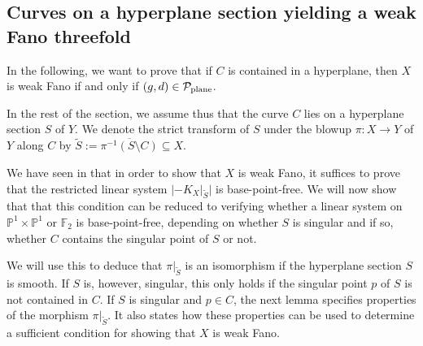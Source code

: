 \documentclass[english,11pt,reqno]{amsart}
\newcommand{\sub}{\subseteq}
\newcommand{\PxP}{\mathbb{P}^1 \times \mathbb{P}^1}
\newcommand{\Ftwo}{\mathbb{F}_2}
\begin{document}
\subsection{Curves on a hyperplane section yielding a weak Fano threefold} \label{subsection:hyperplane_weak_Fano}
%
In the following, we want to prove that if $C$ is contained in a hyperplane, then $X$ is weak Fano if and only if $(g,d)\in \mathcal{P}_{\textup{plane}}$. \par 
In the rest of the section, we assume thus that the curve $C$ lies on a hyperplane section $S$ of $Y$. We denote the strict transform of $S$ under the blowup $\pi:X\rightarrow Y$ of $Y$ along $C$ by $\widetilde{S}:=\overline{\pi^{-1}(S\setminus C)}\sub X$. \par 
We have seen in  that in order to show that $X$ is weak Fano, it suffices to prove that the restricted linear system $|-K_X|_{\widetilde{S}}|$ is base-point-free.
%
%
We will now show that that this condition can be reduced to verifying whether a linear system on $\PxP$ or $\Ftwo$ is base-point-free, depending on whether $S$ is singular and if so, whether $C$ contains the singular point of $S$ or not.
%

%
We will use this to deduce that $\pi|_{\widetilde{S}}$ is an isomorphism if the hyperplane section $S$ is smooth. If $S$ is, however, singular, this only holds if the singular point $p$ of $S$ is not contained in $C$. If $S$ is singular and $p\in C$, the next lemma specifies properties of the morphism $\pi|_{\widetilde{S}} $. It also states how these properties can be used to determine a sufficient condition for showing that $X$ is weak Fano.
\end{document}
